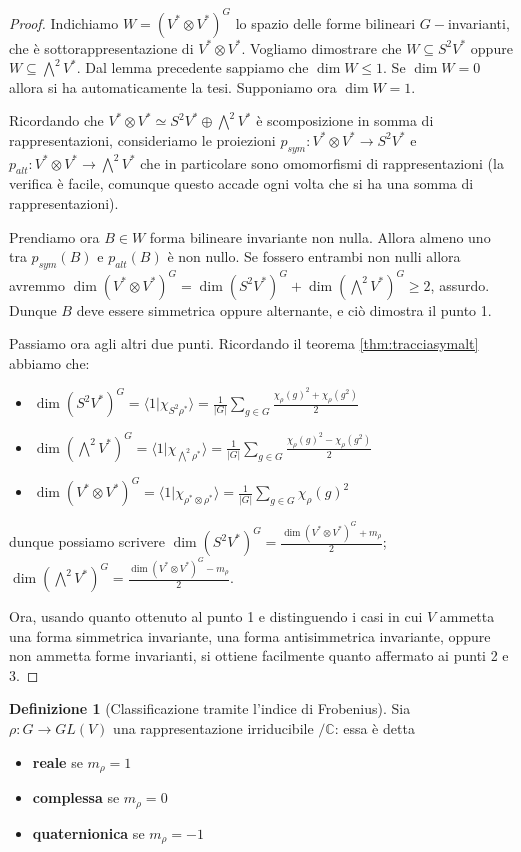 \documentclass[11pt]{article}
\theoremstyle{plain}
\theoremstyle{definition}
\newtheorem{defn}{Definizione}[section]
\theoremstyle{remark}
\newcommand{\C}{\mathbb{C}}
\newcommand{\dsum}{\displaystyle\sum}
\DeclareMathOperator{\iso}{\simeq}
\begin{document}
\begin{proof}
Indichiamo $W = (V^*\otimes V^*)^G$ lo spazio delle forme bilineari $G-$invarianti, che è sottorappresentazione di $V^*\otimes V^*$.
Vogliamo dimostrare che $W\subseteq S^2V^*$ oppure $W\subseteq \bigwedge^2V^*$.
Dal lemma precedente sappiamo che $\dim W \le 1$. Se $\dim W = 0$ allora si ha automaticamente la tesi.
Supponiamo ora $\dim W = 1$.

Ricordando che $V^*\otimes V^* \iso S^2V^* \oplus \bigwedge^2V^*$ è scomposizione in somma di rappresentazioni,
consideriamo le proiezioni $p_{sym}:V^*\otimes V^* \to S^2V^*$ e $p_{alt}:V^*\otimes V^* \to \bigwedge^2V^*$
che in particolare sono omomorfismi di rappresentazioni (la verifica è facile, comunque questo accade ogni volta che si ha una somma di rappresentazioni).

Prendiamo ora $B\in W$ forma bilineare invariante non nulla. Allora almeno uno tra $p_{sym}(B)$ e $p_{alt}(B)$ è non nullo. Se fossero entrambi non nulli allora avremmo $\dim (V^*\otimes V^*)^G = \dim(S^2V^*)^G + \dim(\bigwedge^2V^*)^G \ge 2$, assurdo.
Dunque $B$ deve essere simmetrica oppure alternante, e ciò dimostra il punto 1.

Passiamo ora agli altri due punti. Ricordando il teorema \ref{thm:tracciasymalt} abbiamo che:
\begin{itemize}
\item $\dim(S^2V^*)^G = \langle 1|\chi_{S^2\rho^*}\rangle = \frac{1}{|G|}\dsum_{g\in G}\frac{\chi_\rho(g)^2 + \chi_\rho(g^2)}{2}$
\item $\dim(\bigwedge^2V^*)^G = \langle 1|\chi_{\bigwedge^2\rho^*}\rangle = \frac{1}{|G|}\dsum_{g\in G}\frac{\chi_\rho(g)^2 - \chi_\rho(g^2)}{2}$
\item $\dim(V^*\otimes V^*)^G = \langle 1|\chi_{\rho^*\otimes\rho^*}\rangle = \frac{1}{|G|}\dsum_{g\in G}\chi_\rho(g)^2$
\end{itemize}
dunque possiamo scrivere
$\dim(S^2V^*)^G = \frac{\dim(V^*\otimes V^*)^G + m_\rho}{2}$;\ \
$\dim(\bigwedge^2V^*)^G = \frac{\dim(V^*\otimes V^*)^G - m_\rho}{2}$.

Ora, usando quanto ottenuto al punto 1 e distinguendo i casi in cui $V$ ammetta una forma simmetrica invariante, una forma antisimmetrica invariante, oppure non ammetta forme invarianti, si ottiene facilmente quanto affermato ai punti 2 e 3.
\end{proof}

\begin{defn}[Classificazione tramite l'indice di Frobenius]
Sia $\rho:G\rightarrow GL(V)$ una rappresentazione irriducibile $/\C$: essa è detta
\begin{itemize}
\item \textbf{reale} se $m_\rho = 1$
\item \textbf{complessa} se $m_\rho = 0$
\item \textbf{quaternionica} se $m_\rho = -1$
\end{itemize}
\end{defn}
\end{document}
